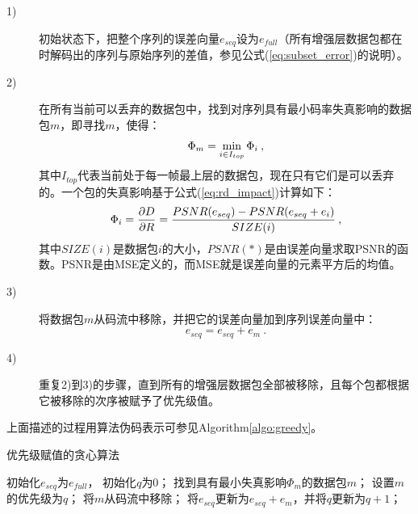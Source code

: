 \begin{description}
	\vspace{10pt}
	\item[1)] 初始状态下，把整个序列的误差向量$e_{seq}$设为$e_{full}$（所有增强层数据包都在时解码出的序列与原始序列的差值，参见公式(\ref{eq:subset_error})的说明）。
	\vspace{10pt}
	\item[2)] 在所有当前可以丢弃的数据包中，找到对序列具有最小码率失真影响的数据包$m$，即寻找$m$，使得：
	\begin{equation}
	\vspace{10pt}
	\label{eq:R-D_impact_m}
	\Phi_m = \min_{i \in I_{top}} \Phi_i \: ,
	\end{equation}
	其中$I_{top}$代表当前处于每一帧最上层的数据包，现在只有它们是可以丢弃的。一个包的失真影响基于公式(\ref{eq:rd_impact})计算如下： 
	\vspace{10pt}
	\begin{equation}
	\vspace{10pt}
	\label{eq:R-D_impact_i}
	\Phi_i = \dfrac{\partial D}{\partial R} = \dfrac{PSNR(e_{seq}) - PSNR(e_{seq} + e_i)}{SIZE(i)} \: ,
	\end{equation}
	其中$SIZE(i)$是数据包$i$的大小，$PSNR(*)$是由误差向量求取PSNR的函数。PSNR是由MSE定义的，而MSE就是误差向量的元素平方后的均值。
	\vspace{10pt}
	\item[3)]将数据包$m$从码流中移除，并把它的误差向量加到序列误差向量中：
	\begin{equation}
	\label{eq:error_update}
	e_{seq} = e_{seq} + e_m \: .
	\end{equation}
	\item[4)]重复2)到3)的步骤，直到所有的增强层数据包全部被移除，且每个包都根据它被移除的次序被赋予了优先级值。
	\vspace{10pt}
\end{description}

上面描述的过程用算法伪码表示可参见Algorithm\ref{algo:greedy}。

\begin{algorithm}
	\caption{优先级赋值的贪心算法}
	\label{algo:greedy}
	\begin{algorithmic}
		\STATE 初始化$e_{seq}$为$e_{full}$， 初始化$q$为0；
		\STATE 找到具有最小失真影响$\Phi_m$的数据包$m$；
		\ENDFOR
		\STATE 设置$m$的优先级为$q$；
		\STATE 将$m$从码流中移除；
		\STATE 将$e_{seq}$更新为$e_{seq} + e_m$，并将$q$更新为$q+1$；
		\ENDWHILE
	\end{algorithmic}
\end{algorithm}


